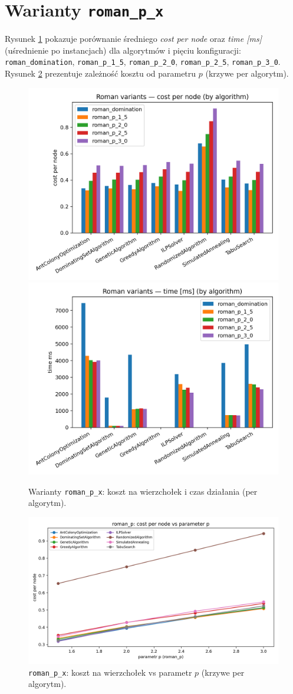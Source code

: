\section{Warianty \texttt{roman\_p\_x}}

Rysunek \ref{fig:roman_group} pokazuje porównanie średniego \textit{cost per node} oraz \textit{time [ms]} (uśrednienie po instancjach) dla algorytmów i pięciu konfiguracji: \texttt{roman\_domination}, \texttt{roman\_p\_1\_5}, \texttt{roman\_p\_2\_0}, \texttt{roman\_p\_2\_5}, \texttt{roman\_p\_3\_0}. Rysunek \ref{fig:roman_curve} prezentuje zależność kosztu od parametru $p$ (krzywe per algorytm).

\begin{figure}[H]
  \centering
  \includegraphics[width=0.48\linewidth]{assets/figures/extensions/roman_variants_cost.png}
  \includegraphics[width=0.48\linewidth]{assets/figures/extensions/roman_variants_time.png}
  \caption{Warianty \texttt{roman\_p\_x}: koszt na wierzchołek i czas działania (per algorytm).}
  \label{fig:roman_group}
\end{figure}

\begin{figure}[H]
  \centering
  \includegraphics[width=0.7\linewidth]{assets/figures/extensions/roman_p_curve_cost_per_node.png}
  \caption{\texttt{roman\_p\_x}: koszt na wierzchołek vs parametr $p$ (krzywe per algorytm).}
  \label{fig:roman_curve}
\end{figure}

